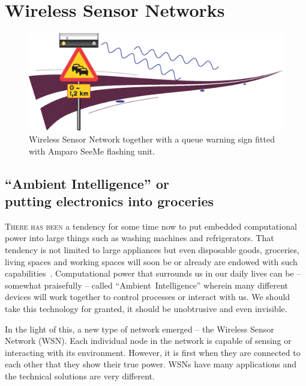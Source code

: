 \cleardoublepage\chapter{Wireless Sensor Networks}\label{chap:network}
\begin{figure}[tbhf]
 \centering
 \includegraphics[width=1\linewidth]{images/queueRoad}
 \caption[Wireless Sensor Network]{Wireless Sensor Network together with a queue warning sign fitted with Amparo SeeMe\mtm{} flashing unit.}
 \label{fig:queueRoad}
\end{figure}

\section[``Ambient Intelligence'' or putting electronics into groceries]{``Ambient Intelligence'' or\\ putting electronics into groceries}
\textsc{There has been} a tendency for some time now to put embedded computational power into large things such as washing machines and refrigerators. That tendency is not limited to large appliances but even disposable goods, groceries, living spaces and working spaces will soon be or already are endowed with such capabilities~\cite{Karl70}. Computational power that surrounds us in our daily lives can be -- somewhat praisefully -- called \mbox{``Ambient Intelligence''} wherein many different devices will work together to control processes or interact with us. We should take this technology for granted, it should be unobtrusive and even invisible.

In the light of this, a new type of network emerged -- the Wireless Sensor Network (WSN). Each individual node in the network is capable of sensing or interacting with its environment. However, it is first when they are connected to each other that they show their true power. WSNs have many applications and the technical solutions are very different. 
 	
